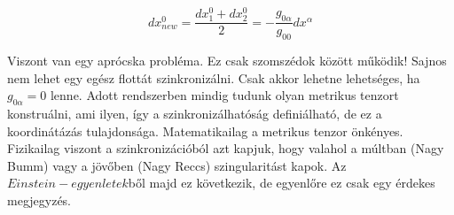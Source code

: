 \documentclass[a4paper, 12pt]{article}
\begin{document}
\begin{equation}
    dx^{0}_{new} = \frac{dx_{1}^{0} + dx_2^{0}}{2} = -\frac{g_{0\alpha}}{g_{00}}dx^{\alpha}
\end{equation}
\par Viszont van egy aprócska probléma. Ez csak szomszédok között működik! Sajnos nem lehet egy egész flottát szinkronizálni. Csak akkor lehetne lehetséges, ha $g_{0\alpha} = 0$ lenne. Adott rendszerben mindig tudunk olyan metrikus tenzort konstruálni, ami ilyen, így a szinkronizálhatóság definiálható, de ez a koordinátázás tulajdonsága. Matematikailag a metrikus tenzor önkényes. Fizikailag viszont a szinkronizációból azt kapjuk, hogy valahol a múltban (Nagy Bumm) vagy a jövőben  (Nagy Reccs) szingularitást kapok. Az $Einstein-egyenletek$ből majd ez következik, de egyenlőre ez csak egy érdekes megjegyzés. 
\end{document}
